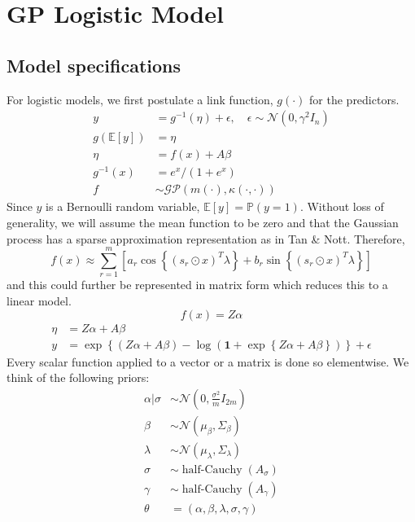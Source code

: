 \documentclass[11pt]{article}
\newcommand{\bs}{\boldsymbol}
\newcommand{\opn}{\operatorname}
\begin{document}
\section{GP Logistic Model}
\subsection{Model specifications}
For logistic models, we first postulate a link function, $g\left(\cdot \right)$ for the predictors.
\begin{align*}
  y &= g^{-1}\left(\eta\right) + \epsilon, \quad \epsilon \sim \mathcal{N}\left(0, \gamma^{2}I_{n}\right)\\
  g\left(\mathbb{E}\left[y\right]\right) &= \eta\\
  \eta &= f\left(x\right) + A\beta\\
  g^{-1}\left(x\right) &= e^{x}/\left(1+e^{x}\right)\\
  f &\sim \mathcal{GP}\left(m\left(\cdot \right), \kappa\left(\cdot, \cdot \right)\right)
\end{align*}
Since $y$ is a Bernoulli random variable, $\mathbb{E}\left[y\right] = \mathbb{P}\left(y=1\right)$. Without loss of generality, we will assume the mean function to be zero and that the Gaussian process has a sparse approximation representation as in Tan \& Nott. Therefore,
$$
  f\left(x\right) \approx \sum_{r=1}^{m}\left[a_{r}\cos \left\{\left(s_{r} \odot x\right)^{T}\lambda \right\}+b_{r}\sin \left\{\left(s_{r}\odot x\right)^{T}\lambda \right\}\right]
$$
and this could further be represented in matrix form which reduces this to a linear model.
$$
  f\left(x\right) = Z\alpha
$$
\begin{align*}
  \eta &= Z\alpha + A\beta\\
  y &= \exp\left\{\left(Z\alpha+A\beta\right) -\log \left(\bs{1}+\exp \left\{Z\alpha +A\beta \right\}\right) \right\} + \epsilon
\end{align*}
Every scalar function applied to a vector or a matrix is done so elementwise. We think of the following priors:
\begin{align*}
  \alpha|\sigma &\sim \mathcal{N}\left(0, \frac{\sigma^{2}}{m}I_{2m}\right)\\
  \beta &\sim \mathcal{N}\left(\mu_{\beta}, \Sigma_{\beta}\right) \\
  \lambda &\sim \mathcal{N}\left(\mu_{\lambda}, \Sigma_{\lambda}\right) \\
  \sigma &\sim \opn{half-Cauchy}\left(A_{\sigma}\right) \\
  \gamma &\sim \opn{half-Cauchy}\left(A_{\gamma}\right)\\
  \theta &= \left(\alpha, \beta, \lambda, \sigma, \gamma\right)
\end{align*}
\end{document}
